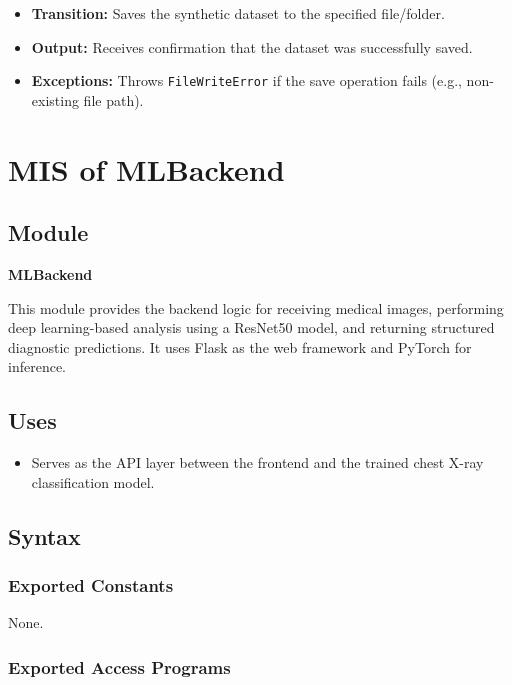 \documentclass[12pt, titlepage]{article}
\begin{document}
\begin{itemize}
    \item \textbf{Transition:} Saves the synthetic dataset to the specified file/folder.
    \item \textbf{Output:} Receives confirmation that the dataset was successfully saved.
    \item \textbf{Exceptions:} Throws \texttt{FileWriteError} if the save operation fails (e.g., non-existing file path).
\end{itemize}


\section{MIS of MLBackend}
\label{sec:MLBackend}

\subsection{Module}
\label{sec:MLBackendModule}

\textbf{MLBackend}

This module provides the backend logic for receiving medical images, performing deep learning-based analysis using a ResNet50 model, and returning structured diagnostic predictions. It uses Flask as the web framework and PyTorch for inference.

\subsection{Uses}
\label{sec:MLBackendUses}

\begin{itemize}
    \item Serves as the API layer between the frontend and the trained chest X-ray classification model.
\end{itemize}

\subsection{Syntax}
\label{sec:MLBackendSyntax}

\subsubsection{Exported Constants}
None.

\subsubsection{Exported Access Programs}
\label{sec:MLBackendExported}
\end{document}
